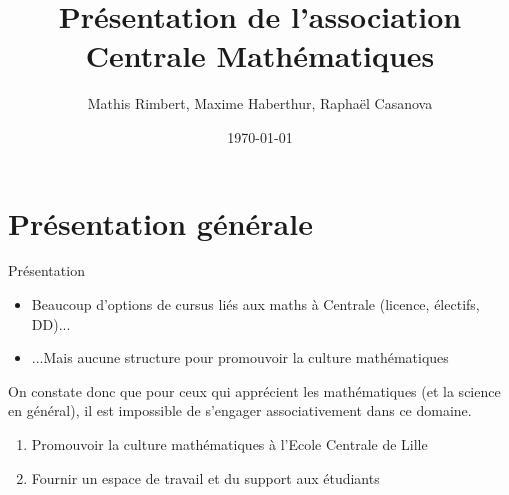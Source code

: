 \documentclass{beamer}
\title[Présentation de l'association]{Présentation de l'association Centrale Mathématiques}
\author[Centrale Mathématiques] {Mathis Rimbert, Maxime Haberthur, Raphaël Casanova}
\institute[NTU] %
{
}
\date{\today} %
\begin{document}
\begin{frame}
    \titlepage
\end{frame}

\sepframe[title = {Sommaire}]



\section{Présentation générale}

\begin{frame}{Présentation}
  \begin{itemize}
    \item Beaucoup d'options de cursus liés aux maths à Centrale (licence, électifs, DD)...
    \item ...Mais aucune structure pour promouvoir la culture mathématiques
  \end{itemize}
  On constate donc que pour ceux qui apprécient les mathématiques (et la science en général), il est impossible de s'engager associativement dans ce domaine.

  \begin{enumerate}
    \item Promouvoir la culture mathématiques à l'Ecole Centrale de Lille
    \item Fournir un espace de travail et du support aux étudiants
  \end{enumerate}
\end{frame}
\end{document}
